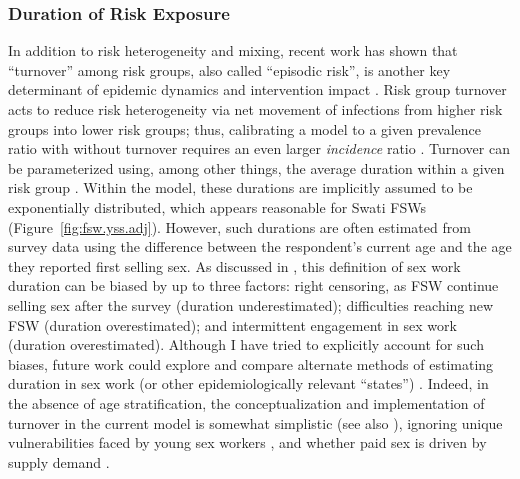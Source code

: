 \subsubsection{Duration of Risk Exposure}\label{model.disc.par.dur}
In addition to risk heterogeneity and mixing, recent work has shown that
``turnover'' among risk groups, also called ``episodic risk'', is another key determinant of
epidemic dynamics and intervention impact \cite{Henry2015,Knight2020}.
Risk group turnover acts to reduce risk heterogeneity via
net movement of infections from higher risk groups into lower risk groups;
thus, calibrating a model to a given prevalence ratio with \vs without turnover
requires an even larger \emph{incidence} ratio \cite{Knight2020}.
Turnover can be parameterized using, among other things,
the average duration within a given risk group \cite{Knight2020}.
Within the model, these durations are implicitly assumed to be exponentially distributed,
which appears reasonable for Swati FSWs \cite{Baral2014,EswKP2014} (Figure~\ref{fig:fsw.yss.adj}).
However, such durations are often estimated from survey data using the difference between
the respondent's current age and the age they reported first selling sex.
As discussed in ,
this definition of sex work duration can be biased by up to three factors:
right censoring, as FSW continue selling sex after the survey (duration underestimated);
difficulties reaching new FSW \cite{Cheuk2020} (duration overestimated);
and intermittent engagement in sex work (duration overestimated).
Although I have tried to explicitly account for such biases,
future work could explore and compare alternate methods of estimating
duration in sex work (or other epidemiologically relevant ``states'') \cite{Fazito2012}.
Indeed, in the absence of age stratification,
the conceptualization and implementation of turnover in the current model is somewhat simplistic
(see also ), ignoring
unique vulnerabilities faced by young sex workers \cite{Cheuk2020}, and
whether paid sex is driven by supply \vs demand \cite{Garnett1993,Steen2019}.
